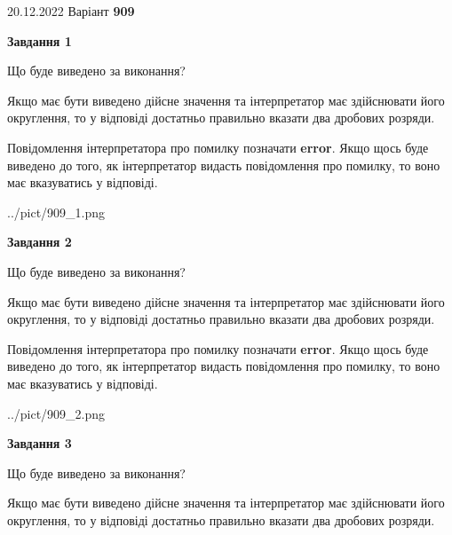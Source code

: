 \documentclass[12pt, ukrainian]{article}
\begin{document}
{20.12.2022 Варіант \No \textbf { 909 }\par}
{
\begin {Large}

{\begin {center}\textbf{Завдання 1}\end {center}}\par
Що буде виведено за виконання? \par

Якщо має бути виведено дійсне значення та інтерпретатор має здійснювати його округлення, 
то у відповіді достатньо правильно вказати два дробових розряди.

Повідомлення інтерпретатора про помилку позначати \textbf{error}.
Якщо щось буде виведено до того, як інтерпретатор видасть повідомлення про помилку, 
то воно має вказуватись у відповіді. \par

\begin{center}
	{../pict/909_1.png}
\end{center}
\newpage

{\begin {center}\textbf{Завдання 2}\end {center}}\par
Що буде виведено за виконання? \par

Якщо має бути виведено дійсне значення та інтерпретатор має здійснювати його округлення, 
то у відповіді достатньо правильно вказати два дробових розряди.

Повідомлення інтерпретатора про помилку позначати \textbf{error}.
Якщо щось буде виведено до того, як інтерпретатор видасть повідомлення про помилку, 
то воно має вказуватись у відповіді. \par

\begin{center}
	{../pict/909_2.png}
\end{center}
\newpage

{\begin {center}\textbf{Завдання 3}\end {center}}\par
Що буде виведено за виконання? \par

Якщо має бути виведено дійсне значення та інтерпретатор має здійснювати його округлення, 
то у відповіді достатньо правильно вказати два дробових розряди.


\end{Large}}
\end{document}
